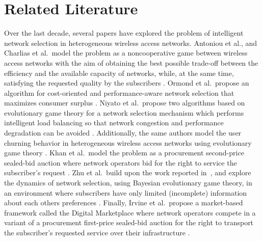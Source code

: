\section{Related Literature} %
\label{sec:related_literature_literature}
Over the last decade, several papers have explored the problem of intelligent network selection in heterogeneous wireless access networks. Antoniou et al., and Charlias et al.~model the problem as a noncooperative game between wireless access networks with the aim of obtaining the best possible trade-off between the efficiency and the available capacity of networks, while, at the same time, satisfying the requested quality by the subscribers \cite{Antoniou07, Charilas08}. Ormond et al.~propose an algorithm for cost-oriented and performance-aware network selection that maximizes consumer surplus \cite{OrmondCS106, OrmondCS206}. Niyato et al.~propose two algorithms based on evolutionary game theory for a network selection mechanism which performs intelligent load balancing so that network congestion and performance degradation can be avoided \cite{Niyato09}. Additionally, the same authors model the user churning behavior in heterogeneous wireless access networks using evolutionary game theory \cite{NiyatoHossainConf2008}. Khan et al.~model the problem as a procurement second-price sealed-bid auction where network operators bid for the right to service the subscriber's request \cite{Khan110, Khan210}. Zhu et al.~build upon the work reported in~\cite{Niyato09}, and explore the dynamics of network selection, using Bayesian evolutionary game theory, in an environment where subscribers have only limited (incomplete) information about each others preferences \cite{ZhuNiyato2010}. Finally, Irvine et al.~propose a market-based framework called the Digital Marketplace where network operators compete in a variant of a procurement first-price sealed-bid auction for the right to transport the subscriber's requested service over their infrastructure \cite{DMLeBodic00, DMIrvine01, DMIrvine02}.

